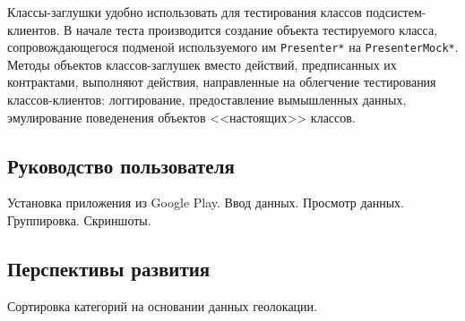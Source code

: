 Классы-заглушки удобно использовать для тестирования классов подсистем-клиентов.
В начале теста производится создание объекта тестируемого класса,
сопровождающегося подменой используемого им \texttt{Presenter*}
на \texttt{PresenterMock*}.
Методы объектов классов-заглушек вместо действий, предписанных их контрактами,
выполняют действия, направленные на облегчение тестирования классов-клиентов:
логгирование, предоставление вымышленных данных,
эмулирование поведенения объектов <<настоящих>> классов.

\subsection{Руководство пользователя}

Установка приложения из Google Play.
Ввод данных. Просмотр данных. Группировка.
Скриншоты.

\subsection{Перспективы развития}

Сортировка категорий на основании данных геолокации.
